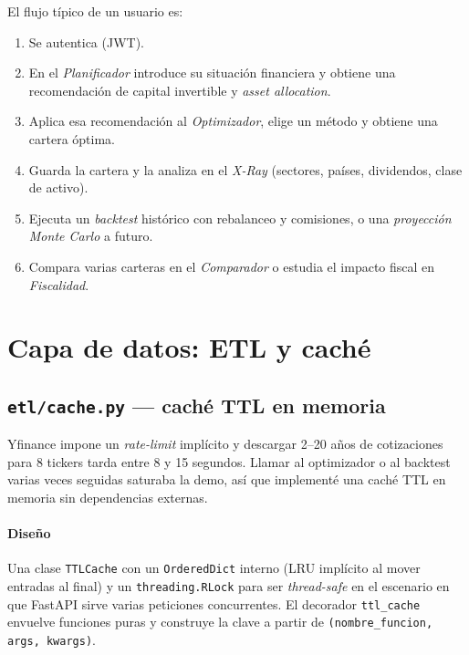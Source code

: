 \documentclass[11pt,a4paper]{article}
\begin{document}
\noindent El flujo típico de un usuario es:

\begin{enumerate}
  \item Se autentica (JWT).
  \item En el \textit{Planificador} introduce su situación financiera y obtiene una recomendación de capital invertible y \textit{asset allocation}.
  \item Aplica esa recomendación al \textit{Optimizador}, elige un método y obtiene una cartera óptima.
  \item Guarda la cartera y la analiza en el \textit{X-Ray} (sectores, países, dividendos, clase de activo).
  \item Ejecuta un \textit{backtest} histórico con rebalanceo y comisiones, o una \textit{proyección Monte Carlo} a futuro.
  \item Compara varias carteras en el \textit{Comparador} o estudia el impacto fiscal en \textit{Fiscalidad}.
\end{enumerate}

\section{Capa de datos: ETL y caché}

\subsection{\texttt{etl/cache.py} — caché TTL en memoria}

Yfinance impone un \textit{rate-limit} implícito y descargar 2--20 años de cotizaciones para 8 tickers tarda entre 8 y 15 segundos. Llamar al optimizador o al backtest varias veces seguidas saturaba la demo, así que implementé una caché TTL en memoria sin dependencias externas.

\paragraph{Diseño}
Una clase \texttt{TTLCache} con un \texttt{OrderedDict} interno (LRU implícito al mover entradas al final) y un \texttt{threading.RLock} para ser \textit{thread-safe} en el escenario en que FastAPI sirve varias peticiones concurrentes. El decorador \texttt{ttl\_cache} envuelve funciones puras y construye la clave a partir de \texttt{(nombre\_funcion, args, kwargs)}.
\end{document}
